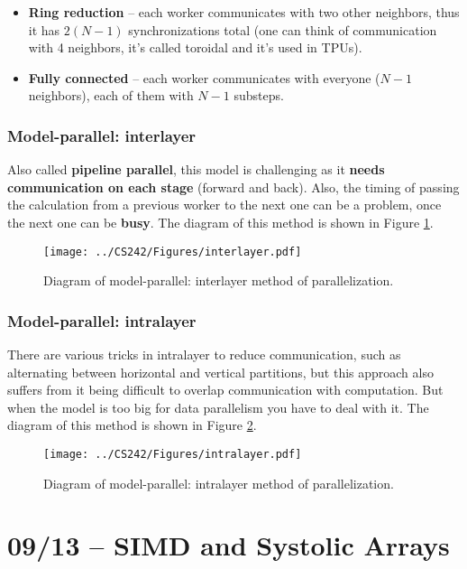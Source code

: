 \documentclass[abstract=true]{scrartcl}
\begin{document}
\begin{itemize}
    \item \textbf{Ring reduction} -- each worker communicates with two other neighbors, thus it has $2(N-1)$ synchronizations total (one can think of communication with 4 neighbors, it's called toroidal and it's used in TPUs).
    \item \textbf{Fully connected} -- each worker communicates with everyone ($N-1$ neighbors), each of them with $N-1$ substeps.
\end{itemize}

\subsubsection{Model-parallel: interlayer}
Also called \textbf{pipeline parallel}, this model is challenging as it \textbf{needs communication on each stage} (forward and back). Also, the timing of passing the calculation from a previous worker to the next one can be a problem, once the next one can be \textbf{busy}.
The diagram of this method is shown in Figure \ref{fig:interlayer}.
\begin{figure}
    \centering
    \texttt{[image: ../CS242/Figures/interlayer.pdf]}
    \caption{Diagram of model-parallel: interlayer method of parallelization.}
    \label{fig:interlayer}
\end{figure}

\subsubsection{Model-parallel: intralayer}
There are various tricks in intralayer to reduce communication, such as alternating between horizontal and vertical partitions, but this approach also suffers from it being difficult to overlap communication with computation. But when the model is too big for data parallelism you have to deal with it.
The diagram of this method is shown in Figure \ref{fig:intralayer}.
\begin{figure}
    \centering
    \texttt{[image: ../CS242/Figures/intralayer.pdf]}
    \caption{Diagram of model-parallel: intralayer method of parallelization.}
    \label{fig:intralayer}
\end{figure}

\section{09/13 -- SIMD and Systolic Arrays}






\end{document}
